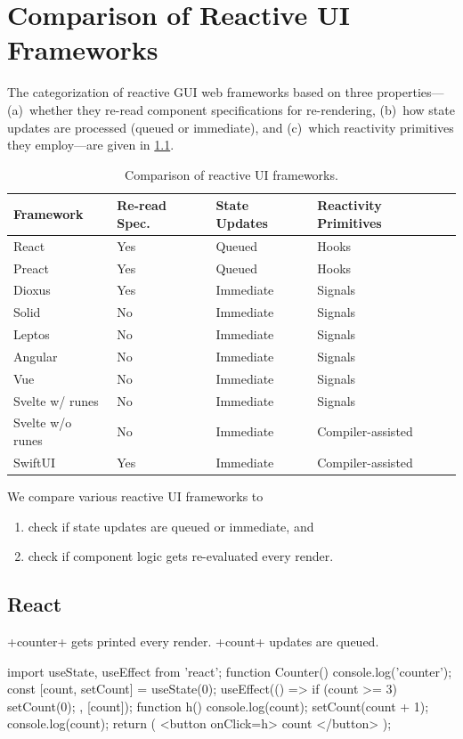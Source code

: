 \chapter{Comparison of Reactive UI Frameworks}\label{app:chap:frameworks}
The categorization of reactive GUI web frameworks based on three properties---(a)~whether they re-read component specifications for re-rendering, (b)~how state updates are processed (queued or immediate), and (c)~which reactivity primitives they employ---are given in \cref{tab:frameworks}.

\begin{table}[tbp]
  \centering
  \caption{Comparison of reactive UI frameworks.}\label{tab:frameworks}
  \smaller[1]
  \begin{tabular}{llll}
    \toprule
    Framework & Re-read Spec. & State Updates & Reactivity Primitives \\
    \midrule
    React & Yes & Queued & Hooks \\
    Preact & Yes & Queued & Hooks \\
    Dioxus & Yes & Immediate & Signals \\
    Solid & No & Immediate & Signals \\
    Leptos & No & Immediate & Signals \\
    Angular & No & Immediate & Signals \\
    Vue & No & Immediate & Signals \\
    Svelte w/ runes & No & Immediate & Signals \\
    Svelte w/o runes & No & Immediate & Compiler-assisted \\
    SwiftUI & Yes & Immediate & Compiler-assisted \\
    \bottomrule
  \end{tabular}
\end{table}

\DefineShortVerb{\+}
We compare various reactive UI frameworks to
\begin{enumerate}
  \item check if state updates are queued or immediate, and
  \item check if component logic gets re-evaluated every render.
\end{enumerate}
\section{React}
+counter+ gets printed every render.
+count+ updates are queued.
\begin{reactcode}
import { useState, useEffect } from 'react';
function Counter() {
  console.log('counter');
  const [count, setCount] = useState(0);
  useEffect(() => {
    if (count >= 3) {
      setCount(0);
    }
  }, [count]);
  function h() {
    console.log(count);
    setCount(count + 1);
    console.log(count);
  }
  return (
    <button onClick={h}>
      {count}
    </button>
  );
}
\end{reactcode}


